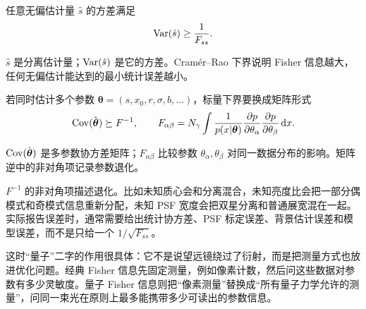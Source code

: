 任意无偏估计量 \(\hat{s}\) 的方差满足
\begin{equation}
  {\rm Var}(\hat{s})\ge \frac{1}{F_{ss}} .
  \label{eq:ch08-crb}
\end{equation}
\begin{formulaexplain}
\(\hat s\) 是分离估计量；\({\rm Var}(\hat s)\) 是它的方差。Cramér--Rao 下界说明 Fisher 信息越大，任何无偏估计能达到的最小统计误差越小。
\end{formulaexplain}
若同时估计多个参数 \(\boldsymbol{\theta}=(s,x_0,r,\sigma,b,\ldots)\)，标量下界要换成矩阵形式
\begin{equation}
  {\rm Cov}(\hat{\boldsymbol{\theta}})\succeq F^{-1},\qquad
  F_{\alpha\beta}=N_\gamma\int
  \frac{1}{p(x|\boldsymbol{\theta})}
  \frac{\partial p}{\partial\theta_\alpha}
  \frac{\partial p}{\partial\theta_\beta}\,{\rm d}x .
  \label{eq:ch08-fisher-matrix}
\end{equation}
\begin{formulaexplain}
\({\rm Cov}(\hat{\boldsymbol\theta})\) 是多参数协方差矩阵；\(F_{\alpha\beta}\) 比较参数 \(\theta_\alpha,\theta_\beta\) 对同一数据分布的影响。矩阵逆中的非对角项记录参数退化。
\end{formulaexplain}
\(F^{-1}\) 的非对角项描述退化。比如未知质心会和分离混合，未知亮度比会把一部分偶模式和奇模式信息重新分配，未知 PSF 宽度会把双星分离和普通展宽混在一起。实际报告误差时，通常需要给出统计协方差、PSF 标定误差、背景估计误差和模型误差，而不是只给一个 \(1/\sqrt{F_{ss}}\)。

这时“量子”二字的作用很具体：它不是说望远镜绕过了衍射，而是把测量方式也放进优化问题。经典 Fisher 信息先固定测量，例如像素计数，然后问这些数据对参数有多少灵敏度。量子 Fisher 信息则把“像素测量”替换成“所有量子力学允许的测量”，问同一束光在原则上最多能携带多少可读出的参数信息。

